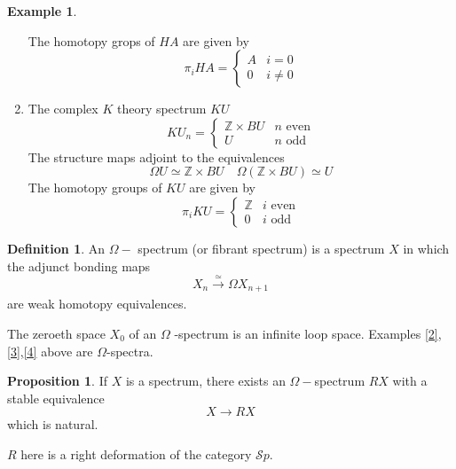 \documentclass[notitlepage,12pt]{article}
\theoremstyle{definition}
\newtheorem{definition}[theorem]{Definition}
\newtheorem{example}[theorem]{Example}
\newtheorem{proposition}[theorem]{Proposition}
\theoremstyle{para}{\normalfont}
\begin{document}
\begin{example}
\begin{enumerate}
    The homotopy grops of $HA$ are given by 
    \[
        \pi_i HA=\begin{cases}
            A&i=0\\
            0&i\neq 0
        \end{cases}
    \]  
    \item \label{4} The complex $K$ theory spectrum $KU$
    \[
        KU_n=\begin{cases}
            \mathbb{Z}\times BU&n \text{ even}\\
            U &n \text{ odd}
        \end{cases}
    \]The structure maps adjoint to the equivalences 
    \[
        \Omega U\simeq \mathbb{Z}\times BU \quad \Omega(\mathbb{Z}\times BU)\simeq U
    \] 
    The homotopy groups of $KU$ are given by 
    \[
        \pi_iKU=\begin{cases}
            \mathbb{Z}&i \text{ even}\\
            0& i \text{ odd}
        \end{cases}
    \]\end{enumerate}
\end{example}
\begin{definition}
    An $\Omega-$ spectrum (or fibrant spectrum) is a spectrum $X$ in which the adjunct bonding maps 
    \[
        X_n\xrightarrow[ ]{\simeq } \Omega X_{n+1 }
    \] are weak homotopy equivalences. 
\end{definition} The zeroeth space $X_0$ of an $\Omega$ -spectrum is an infinite loop space. 
Examples \ref{2},\ref{3},\ref{4} above are $\Omega$-spectra. 

\begin{proposition}
    If $X$ is a spectrum, there exists an $\Omega -$spectrum $RX$ with a stable equivalence 
    \[
        X\to RX
    \] which is natural. 
\end{proposition}

$R$ here is a right deformation of the category $\mathcal{S}p$. 
\end{document}
